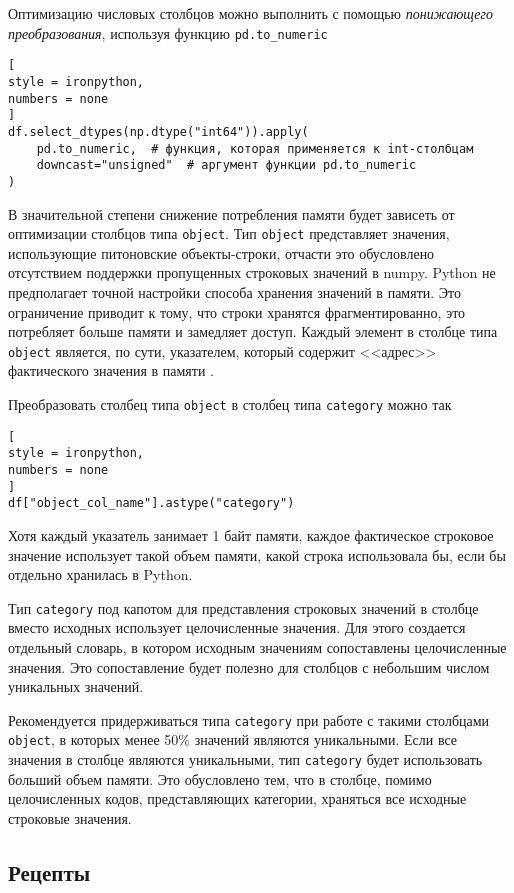 \documentclass[%
	11pt,
	a4paper,
	utf8,
		]{article}
\begin{document}
Оптимизацию числовых столбцов можно выполнить с помощью \emph{понижающего преобразования}, используя функцию \texttt{pd.to\_numeric}
\begin{lstlisting}[
style = ironpython,
numbers = none
]
df.select_dtypes(np.dtype("int64")).apply(
    pd.to_numeric,  # функция, которая применяется к int-столбцам
    downcast="unsigned"  # аргумент функции pd.to_numeric
)
\end{lstlisting}

В значительной степени снижение потребления памяти будет зависеть от оптимизации столбцов типа \texttt{object}. Тип \texttt{object} представляет значения, использующие питоновские объекты-строки, отчасти это обусловлено отсутствием поддержки пропущенных строковых значений в numpy. Python не предполагает точной настройки способа хранения значений в памяти. Это ограничение приводит к тому, что строки хранятся фрагментированно, это потребляет больше памяти и замедляет доступ. Каждый элемент в столбце типа \texttt{object} является, по сути, указателем, который содержит <<адрес>> фактического значения в памяти \cite[]{heydt:pandas-2019}.

Преобразовать столбец типа \texttt{object} в столбец типа \texttt{category} можно так
\begin{lstlisting}[
style = ironpython,
numbers = none
]
df["object_col_name"].astype("category")
\end{lstlisting}

Хотя каждый указатель занимает 1 байт памяти, каждое фактическое строковое значение использует такой объем памяти, какой строка использовала бы, если бы отдельно хранилась в Python.

Тип \texttt{category} под капотом для представления строковых значений в столбце вместо исходных использует целочисленные значения. Для этого создается отдельный словарь, в котором исходным значениям сопоставлены целочисленные значения. Это сопоставление будет полезно для столбцов с небольшим числом уникальных значений.

Рекомендуется придерживаться типа \texttt{category} при работе с такими столбцами \texttt{object}, в которых менее 50\% значений являются уникальными. Если все значения в столбце являются уникальными, тип \texttt{category} будет использовать б\emph{о}льший объем памяти. Это обусловлено тем, что в столбце, помимо целочисленных кодов, представляющих категории, храняться все исходные строковые значения.


\subsection{Рецепты}
\end{document}
